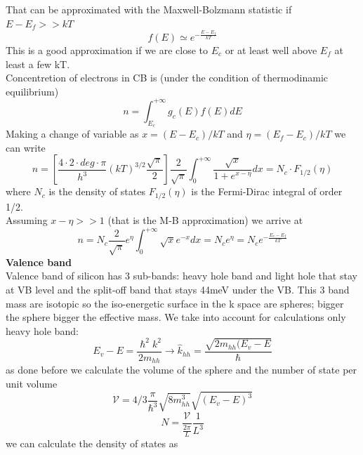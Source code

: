 That can be approximated with the Maxwell-Bolzmann statistic if $E-E_f>>kT$ 
\begin{equation}
f(E)\simeq e^{-\frac{E-E_f}{kT}}
\end{equation}
This is a good approximation if we are close to $E_c$ or at least well above $E_f$ at least a few kT.\\
Concentretion of electrons in CB is (under the condition of thermodinamic equilibrium)
\begin{equation}
n=\int^{+\infty}_{E_c} g_c(E)f(E)dE
\end{equation}
Making a change of variable as $x=(E-E_c)/kT$ and $\eta=(E_f-E_c)/kT$ we can write
\begin{equation}
n=\left[\frac{4\cdot 2\cdot deg \cdot \pi}{h^3}(kT)^{3/2}\frac{\sqrt{\pi}}{2}\right]\frac{2}{\sqrt{\pi}}\int^{+\infty}_0 \frac{\sqrt{x}}{1+e^{x-\eta}}dx=N_c\cdot F_{1/2}(\eta)
\end{equation}  
where $N_c$ is the density of states $F_{1/2}(\eta)$ is the Fermi-Dirac integral of order 1/2.\\
Assuming $x-\eta>>1$ (that is the M-B approximation) we arrive at 
\begin{equation}
n=N_c\frac{2}{\sqrt{\pi}}e^\eta \int^{+\infty}_0\sqrt{x}e^{-x}dx=N_ce^\eta=N_c e^{-\frac{E_c-E_f}{kT}}
\end{equation}
\newline
{\bf Valence band}\\
Valence band of silicon has 3 sub-bands: heavy hole band and light hole that stay at VB level and the split-off band that stays 44meV under the VB. This 3 band mass are isotopic so the iso-energetic surface in the k space are spheres; bigger the sphere bigger the effective mass. We take into account for calculations only heavy hole band: 
\begin{equation}
E_v-E=\frac{\hslash^2 k^2}{2m_{hh}}\rightarrow\hat{k}_{hh}=\frac{\sqrt{2m_{hh}(E_v-E}}{\hslash}
\end{equation} 
as done before we calculate the volume of the sphere and the number of state per unit volume
\begin{equation}
\mathcal{V}=4/3\frac{\pi}{\hslash^3}\sqrt{8m_{hh}^3}\sqrt{(E_v-E)^3} 
\end{equation}
\begin{equation}
N=\frac{\mathcal{V}}{\frac{2\pi}{L}}\frac{1}{L^3}
\end{equation}
we can calculate the density of states as
